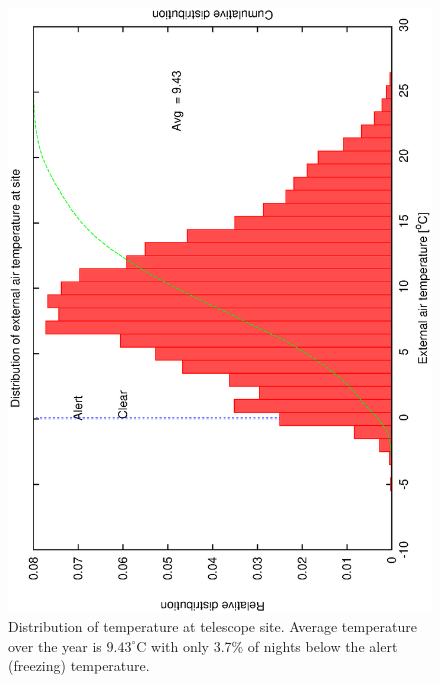 \begin{figure}[htbp]
\begin{center}
    \includegraphics[scale=0.4, angle=-90]{figures/ecs/temp.eps}
\end{center}  
\caption[Distribution of temperature at telescope site.]
{Distribution of temperature at telescope site. Average temperature over the year is $9.43^{\circ}$C with only 3.7\% of nights below the alert (freezing) temperature.}
 \label{fig:met_temp_dist}
\end{figure}


